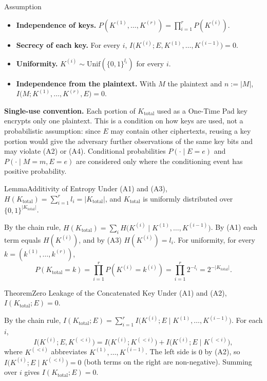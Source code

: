 \begin{statementB}{Assumption}{}\label{assump:concat}
\begin{itemize}
    \item[(A1)] \textbf{Independence of keys.} $P(K^{(1)},\ldots,K^{(r)})=\prod_{i=1}^{r}P(K^{(i)})$.
    \item[(A2)] \textbf{Secrecy of each key.} For every $i$, $I\bigl(K^{(i)};E,K^{(1)},\ldots,K^{(i-1)}\bigr)=0$.
    \item[(A3)] \textbf{Uniformity.} $K^{(i)}\sim\mathrm{Unif}(\{0,1\}^{l_i})$ for every $i$.
    \item[(A4)] \textbf{Independence from the plaintext.} With $M$ the plaintext and $n\mathrel{:=}|M|$, $I\bigl(M;K^{(1)},\ldots,K^{(r)},E\bigr)=0$.
\end{itemize}
\textbf{Single-use convention.} Each portion of $K_{\mathrm{total}}$ used as a One-Time Pad key encrypts only one plaintext. This is a condition on how keys are used, not a probabilistic assumption: since $E$ may contain other ciphertexts, reusing a key portion would give the adversary further observations of the same key bits and may violate (A2) or (A4). Conditional probabilities $P(\cdot\mid E=e)$ and $P(\cdot\mid M=m,E=e)$ are considered only where the conditioning event has positive probability.
\end{statementB}

\begin{statementB}{Lemma}{Additivity of Entropy}\label{lem:concat-entropy}
Under (A1) and (A3), $H(K_{\mathrm{total}})=\sum_{i=1}^{r}l_i=|K_{\mathrm{total}}|$, and $K_{\mathrm{total}}$ is uniformly distributed over $\{0,1\}^{|K_{\mathrm{total}}|}$.
\end{statementB}
\begin{proofB}
By the chain rule, $H(K_{\mathrm{total}})=\sum_i H\bigl(K^{(i)}\mid K^{(1)},\ldots,K^{(i-1)}\bigr)$. By (A1) each term equals $H(K^{(i)})$, and by (A3) $H(K^{(i)})=l_i$. For uniformity, for every $k=(k^{(1)},\ldots,k^{(r)})$,
\[
P(K_{\mathrm{total}}=k)=\prod_{i=1}^{r}P(K^{(i)}=k^{(i)})=\prod_{i=1}^{r}2^{-l_i}=2^{-|K_{\mathrm{total}}|}. 
\]
\end{proofB}

\begin{statementB}{Theorem}{Zero Leakage of the Concatenated Key}\label{thm:concat-zero-leakage}
Under (A1) and (A2), $I(K_{\mathrm{total}};E)=0$.
\end{statementB}
\begin{proofB}
By the chain rule, $I(K_{\mathrm{total}};E)=\sum_{i=1}^{r}I\bigl(K^{(i)};E\mid K^{(1)},\ldots,K^{(i-1)}\bigr)$. For each $i$,
\[
I\bigl(K^{(i)};E,K^{(<i)}\bigr)=I\bigl(K^{(i)};K^{(<i)}\bigr)+I\bigl(K^{(i)};E\mid K^{(<i)}\bigr),
\]
where $K^{(<i)}$ abbreviates $K^{(1)},\ldots,K^{(i-1)}$. The left side is $0$ by (A2), so $I\bigl(K^{(i)};E\mid K^{(<i)}\bigr)=0$ (both terms on the right are non-negative). Summing over $i$ gives $I(K_{\mathrm{total}};E)=0$.
\end{proofB}

